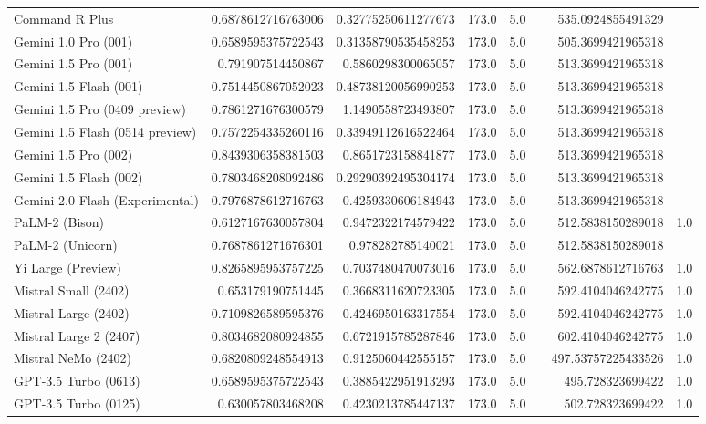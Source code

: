 \begin{table}[htp]
{\begin{tabular}{lrrrrrrr}
Command R Plus & 0.6878612716763006 & 0.32775250611277673 & 173.0 & 5.0 &  & 535.0924855491329 &  \\
Gemini 1.0 Pro (001) & 0.6589595375722543 & 0.31358790535458253 & 173.0 & 5.0 &  & 505.3699421965318 &  \\
Gemini 1.5 Pro (001) & 0.791907514450867 & 0.5860298300065057 & 173.0 & 5.0 &  & 513.3699421965318 &  \\
Gemini 1.5 Flash (001) & 0.7514450867052023 & 0.48738120056990253 & 173.0 & 5.0 &  & 513.3699421965318 &  \\
Gemini 1.5 Pro (0409 preview) & 0.7861271676300579 & 1.1490558723493807 & 173.0 & 5.0 &  & 513.3699421965318 &  \\
Gemini 1.5 Flash (0514 preview) & 0.7572254335260116 & 0.33949112616522464 & 173.0 & 5.0 &  & 513.3699421965318 &  \\
Gemini 1.5 Pro (002) & 0.8439306358381503 & 0.8651723158841877 & 173.0 & 5.0 &  & 513.3699421965318 &  \\
Gemini 1.5 Flash (002) & 0.7803468208092486 & 0.29290392495304174 & 173.0 & 5.0 &  & 513.3699421965318 &  \\
Gemini 2.0 Flash (Experimental) & 0.7976878612716763 & 0.4259330606184943 & 173.0 & 5.0 &  & 513.3699421965318 &  \\
PaLM-2 (Bison) & 0.6127167630057804 & 0.9472322174579422 & 173.0 & 5.0 &  & 512.5838150289018 & 1.0 \\
PaLM-2 (Unicorn) & 0.7687861271676301 & 0.978282785140021 & 173.0 & 5.0 &  & 512.5838150289018 &  \\
Yi Large (Preview) & 0.8265895953757225 & 0.7037480470073016 & 173.0 & 5.0 &  & 562.6878612716763 & 1.0 \\
Mistral Small (2402) & 0.653179190751445 & 0.3668311620723305 & 173.0 & 5.0 &  & 592.4104046242775 & 1.0 \\
Mistral Large (2402) & 0.7109826589595376 & 0.4246950163317554 & 173.0 & 5.0 &  & 592.4104046242775 & 1.0 \\
Mistral Large 2 (2407) & 0.8034682080924855 & 0.6721915785287846 & 173.0 & 5.0 &  & 602.4104046242775 & 1.0 \\
Mistral NeMo (2402) & 0.6820809248554913 & 0.9125060442555157 & 173.0 & 5.0 &  & 497.53757225433526 & 1.0 \\
GPT-3.5 Turbo (0613) & 0.6589595375722543 & 0.3885422951913293 & 173.0 & 5.0 &  & 495.728323699422 & 1.0 \\
GPT-3.5 Turbo (0125) & 0.630057803468208 & 0.4230213785447137 & 173.0 & 5.0 &  & 502.728323699422 & 1.0 \\

\end{tabular}}
\end{table}
